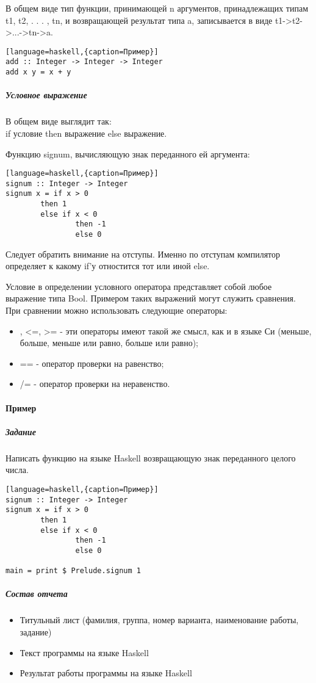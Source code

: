 \documentclass[a4paper,12pt]{article}
\begin{document}
В общем виде тип функции, принимающей n аргументов, принадлежащих типам t1, t2, . . . , tn, и возвращающей результат типа a, записывается в виде t1->t2->...->tn->a.
\begin{lstlisting}[language=haskell,{caption=Пример}]
add :: Integer -> Integer -> Integer
add x y = x + y
\end{lstlisting}

\subparagraph{Условное выражение} В общем виде выглядит так: \\
if условие then выражение else выражение.

Функцию signum, вычисляющую знак переданного ей аргумента:
\begin{lstlisting}[language=haskell,{caption=Пример}]
signum :: Integer -> Integer
signum x = if x > 0
        then 1
        else if x < 0
                then -1
                else 0
\end{lstlisting}
Следует обратить внимание на отступы. Именно по отступам компилятор определяет к какому if'у отностится тот или иной else.

Условие в определении условного оператора представляет собой любое выражение типа Bool. Примером таких выражений могут служить сравнения. При сравнении можно использовать следующие операторы:
\begin{itemize}
	\item <, >, <=, >= - эти операторы имеют такой же смысл, как и в языке Си (меньше, больше, меньше или равно, больше или равно);
	\item == - оператор проверки на равенство;
	\item /= - оператор проверки на неравенство.
\end{itemize}

\paragraph{Пример}
\subparagraph{Задание}
Написать функцию на языке Haskell возвращающую знак переданного целого числа.
\begin{lstlisting}[language=haskell,{caption=Пример}]
signum :: Integer -> Integer
signum x = if x > 0
        then 1
        else if x < 0
                then -1
                else 0

main = print $ Prelude.signum 1
\end{lstlisting}

\subparagraph{Состав отчета}
\begin{itemize}
	\item Титульный лист (фамилия, группа, номер варианта, наименование работы, задание)
	\item Текст программы на языке Haskell
	\item Результат работы программы на языке Haskell
\end{itemize}
\end{document}
